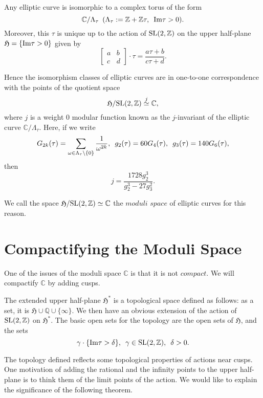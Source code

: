 \documentclass[a4paper,11pt]{article}
\begin{document}
\begin{thm}
Any  elliptic curve is isomorphic to a complex torus of the form
\[
\mathbb{C}/\Lambda_{\tau} \enskip (\Lambda_{\tau}:=\mathbb{Z}+\mathbb{Z}\tau, \enskip \textnormal{Im}\tau > 0).
\]
Moreover, this $\tau$ is unique up to the action of $\textnormal{SL}(2,\mathbb{Z})$ on the upper half-plane $\mathfrak{H}=\{\textnormal{Im}\tau>0\}$ given by
\[
\begin{bmatrix} a & b \\ c & d \end{bmatrix}\cdot\tau = \frac{a\tau+b}{c\tau+d}.
\]

Hence the isomorphism classes of elliptic curves are in one-to-one correspondence with the points of the quotient space
\[
\mathfrak{H}/\textnormal{SL}(2,\mathbb{Z}) \stackrel{j}{\simeq} \mathbb{C},
\]
where $j$ is a weight $0$ modular function known as the $j$-invariant of the elliptic curve $\mathbb{C}/\Lambda_{\tau}$.
Here, if we write
\[
G_{2k}(\tau)=\sum_{\omega \in \Lambda_{\tau} \setminus \{0\}}\frac{1}{\omega^{2k}}, \enskip
g_2(\tau)=60G_4(\tau), \enskip g_3(\tau)=140G_6(\tau),
\]
then
\[
j=\frac{1728g_2^3}{g_2^3-27g_3^2}.
\]
\end{thm}

We call the space $\mathfrak{H}/\textnormal{SL}(2,\mathbb{Z})\simeq\mathbb{C}$ the $\textit{moduli space}$ of elliptic curves for this reason.

\section{Compactifying the Moduli Space}

One of the issues of the moduli space $\mathbb{C}$ is that it is not $\textit{compact}$.
We will compactify $\mathbb{C}$ by adding cusps.

\begin{defn}
The extended upper half-plane $\mathfrak{H}^*$ is a topological space defined as follows: as a set, it is $\mathfrak{H}\cup\mathbb{Q}\cup\{\infty\}$.
We then have an obvious extension of the action of $\textnormal{SL}(2,\mathbb{Z})$ on $\mathfrak{H}^*$.
The basic open sets for the topology are the open sets of $\mathfrak{H}$, and the sets
\[
\gamma\cdot\{\textnormal{Im}\tau > \delta \}, \enskip \gamma \in \textnormal{SL}(2,\mathbb{Z}), \enskip \delta > 0.
\]
\end{defn}

The topology defined reflects some topological properties of actions near cusps.
One motivation of adding the rational and the infinity points to the upper half-plane is to think them of the limit points of the action.
We would like to explain the significance of the following theorem.
\end{document}
